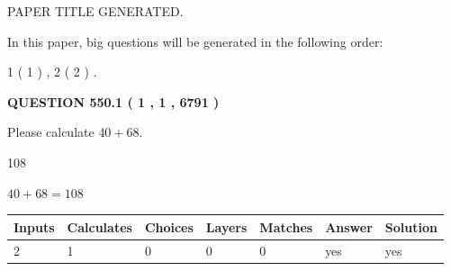 \documentclass[12pt]{article}
\begin{document}
   
   
   
   
   
 \vspace{0.2in}
 
 
 
 
   
   
 PAPER TITLE GENERATED.
   
   
   
\vspace{0.2in}
   
In this paper, big questions will be generated in the following order: 
   
   
   1 ( 1 )
 ,
   2 ( 2 )
 .
  
\vspace{0.2in}
  
{\textbf{\Large{QUESTION
550.1 
 ( 1 , 1 , 6791 )
}}}
  
  
 
Please calculate $ %
40 +  %
68 $.
 
 
 
\noindent{}
 
 

108
 
 
\noindent{}
 
 

 
 
 
\noindent{}
 
 

$ %
40 +  %
68=   %
108$
 
 
\noindent{}
 
 

 
   
   
   
   
\noindent\begin{tabular}{|l|l|l|l|l|l|l|}
 \hline
Inputs & Calculates & Choices & Layers & Matches & Answer & Solution \\ \hline
 2  & 
 1  & 
 0
  & 
 0  & 
 0  & 
  yes & 
  yes 
  \\ \hline
 \end{tabular}
   
   
   
   
\noindent{}
   
\end{document}
